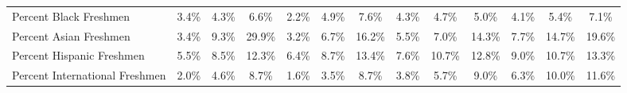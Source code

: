 \documentclass[
]{article}
\begin{document}
\begin{landscape}
\begin{table}
{\begin{tabular}[t]{lcccccccccccc}
Percent Black Freshmen & 3.4\% & 4.3\% & 6.6\% & 2.2\% & 4.9\% & 7.6\% & 4.3\% & 4.7\% & 5.0\% & 4.1\% & 5.4\% & 7.1\%\\
Percent Asian Freshmen & 3.4\% & 9.3\% & 29.9\% & 3.2\% & 6.7\% & 16.2\% & 5.5\% & 7.0\% & 14.3\% & 7.7\% & 14.7\% & 19.6\%\\
Percent Hispanic Freshmen & 5.5\% & 8.5\% & 12.3\% & 6.4\% & 8.7\% & 13.4\% & 7.6\% & 10.7\% & 12.8\% & 9.0\% & 10.7\% & 13.3\%\\
Percent International Freshmen & 2.0\% & 4.6\% & 8.7\% & 1.6\% & 3.5\% & 8.7\% & 3.8\% & 5.7\% & 9.0\% & 6.3\% & 10.0\% & 11.6\%\\
\bottomrule
\end{tabular}}
\end{table}

\clearpage

\begin{table}


\end{table}
\end{landscape}
\end{document}
